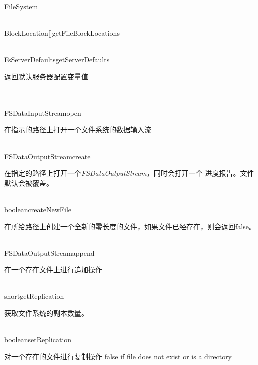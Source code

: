 \begin{XeClass}{FileSystem}
\begin{XeMethod}{\XePublic\\ }{BlockLocation[]}{getFileBlockLocations}
  \end{XeMethod}

  \begin{XeMethod}{\XePublic\\ }{FsServerDefaults}{getServerDefaults}
       
 返回默认服务器配置变量值

  \end{XeMethod}

  \begin{XeMethod}{\XePublic\\ \XeAbstract\\ }{FSDataInputStream}{open}
       
 在指示的路径上打开一个文件系统的数据输入流

  \end{XeMethod}

  \begin{XeMethod}{\XePublic\\ }{FSDataOutputStream}{create}
       
 在指定的路径上打开一个\emph{FSDataOutputStream}，同时会打开一个
 进度报告。文件默认会被覆盖。

  \end{XeMethod}

  \begin{XeMethod}{\XePublic\\ }{boolean}{createNewFile}
       
 在所给路径上创建一个全新的零长度的文件，如果文件已经存在，则会返回false。

  \end{XeMethod}

  \begin{XeMethod}{\XePublic\\ }{FSDataOutputStream}{append}
       
 在一个存在文件上进行追加操作

  \end{XeMethod}

  \begin{XeMethod}{\XePublic\\ }{short}{getReplication}
       
 获取文件系统的副本数量。

  \end{XeMethod}

  \begin{XeMethod}{\XePublic\\ }{boolean}{setReplication}
       
 对一个存在的文件进行复制操作
 false if file does not exist or is a directory


\end{XeMethod}
\end{XeClass}
